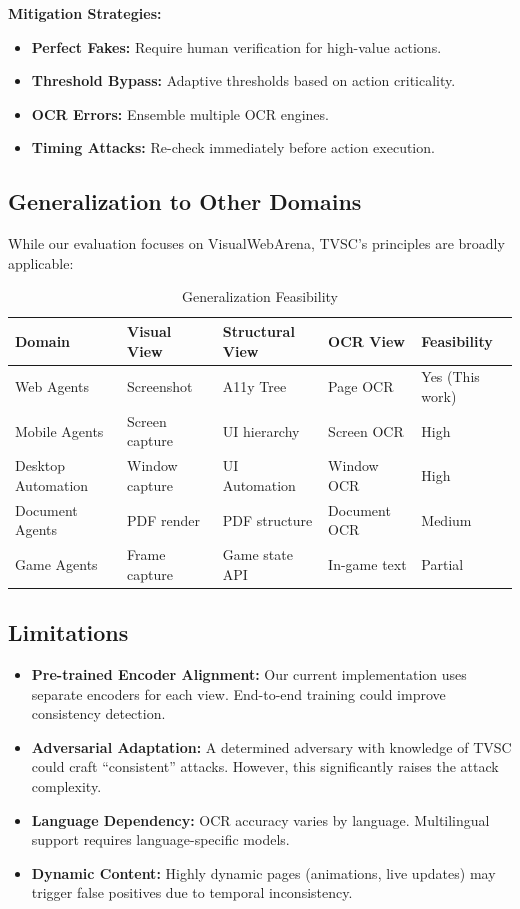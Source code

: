 \documentclass[runningheads]{llncs}
\begin{document}
\textbf{Mitigation Strategies:}
\begin{itemize}
    \item \textbf{Perfect Fakes:} Require human verification for high-value actions.
    \item \textbf{Threshold Bypass:} Adaptive thresholds based on action criticality.
    \item \textbf{OCR Errors:} Ensemble multiple OCR engines.
    \item \textbf{Timing Attacks:} Re-check immediately before action execution.
\end{itemize}

\subsection{Generalization to Other Domains}
While our evaluation focuses on VisualWebArena, TVSC's principles are broadly applicable:

\begin{table}[ht]
\caption{Generalization Feasibility}
\centering
\begin{tabular}{|l|l|l|l|l|}
\hline
Domain & Visual View & Structural View & OCR View & Feasibility \\
\hline
Web Agents & Screenshot & A11y Tree & Page OCR & Yes (This work) \\
Mobile Agents & Screen capture & UI hierarchy & Screen OCR & High \\
Desktop Automation & Window capture & UI Automation & Window OCR & High \\
Document Agents & PDF render & PDF structure & Document OCR & Medium \\
Game Agents & Frame capture & Game state API & In-game text & Partial \\
\hline
\end{tabular}
\end{table}

\subsection{Limitations}
\begin{itemize}
    \item \textbf{Pre-trained Encoder Alignment:} Our current implementation uses separate encoders for each view. End-to-end training could improve consistency detection.
    \item \textbf{Adversarial Adaptation:} A determined adversary with knowledge of TVSC could craft ``consistent'' attacks. However, this significantly raises the attack complexity.
    \item \textbf{Language Dependency:} OCR accuracy varies by language. Multilingual support requires language-specific models.
    \item \textbf{Dynamic Content:} Highly dynamic pages (animations, live updates) may trigger false positives due to temporal inconsistency.
\end{itemize}
\end{document}

